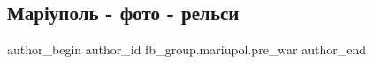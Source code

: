  
 
 
 
 

\subsection{Маріуполь - фото - рельси}
\label{sec:15_02_2023.fb.fb_group.mariupol.pre_war.4.mar_upol___foto___re}

\ifcmt
 author_begin
   author_id fb_group.mariupol.pre_war
 author_end
\fi
